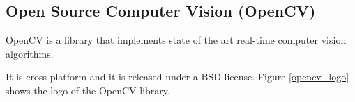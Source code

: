 






	\subsection{Open Source Computer Vision (OpenCV)}
	\label{opencv}

	OpenCV\cite{opencv} is a library that implements state of the art real-time computer vision 
	algorithms. 

	It is cross-platform and it is released under a BSD\cite{BSD} license. 
	Figure \ref{opencv_logo} shows the logo of the OpenCV library. 

